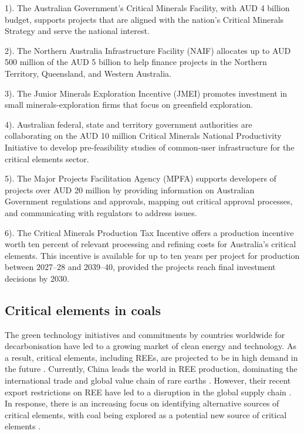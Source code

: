 \documentclass[11pt,a4paper,]{article}
\begin{document}
1). The Australian Government's Critical Minerals Facility, with AUD 4 billion budget, supports projects that are aligned with the nation's Critical Minerals Strategy and serve the national interest.

2). The Northern Australia Infrastructure Facility (NAIF) allocates up to AUD 500 million of the AUD 5 billion to help finance projects in the Northern Territory, Queensland, and Western Australia.

3). The Junior Minerals Exploration Incentive (JMEI) promotes investment in small minerals-exploration firms that focus on greenfield exploration.

4). Australian federal, state and territory government authorities are collaborating on the AUD 10 million Critical Minerals National Productivity Initiative to develop pre-feasibility studies of common-user infrastructure for the critical elements sector.

5). The Major Projects Facilitation Agency (MPFA) supports developers of projects over AUD 20 million by providing information on Australian Government regulations and approvals, mapping out critical approval processes, and communicating with regulators to address issues.

6). The Critical Minerals Production Tax Incentive offers a production incentive worth ten percent of relevant processing and refining costs for Australia's critical elements. This incentive is available for up to ten years per project for production between 2027--28 and 2039--40, provided the projects reach final investment decisions by 2030.

\subsection{Critical elements in coals}\label{critical-elements-in-coals}

The green technology initiatives and commitments by countries worldwide for decarbonisation have led to a growing market of clean energy and technology. As a result, critical elements, including REEs, are projected to be in high demand in the future \autocite{usde2017}. Currently, China leads the world in REE production, dominating the international trade and global value chain of rare earths \autocite{us2024mineral}. However, their recent export restrictions on REE have led to a disruption in the global supply chain \autocite{MANCHERI2015262}. In response, there is an increasing focus on identifying alternative sources of critical elements, with coal being explored as a potential new source of critical elements \autocite{Hodgkinson2021}.
\end{document}
